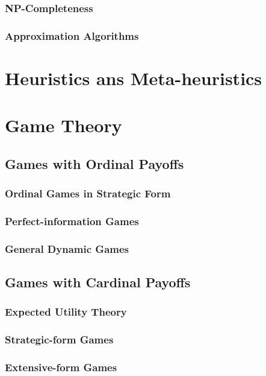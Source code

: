 \documentclass[10pt]{book}
\begin{document}
			\section{NP-Completeness}

			\section{Approximation Algorithms}

	\part{Heuristics ans Meta-heuristics}

	\part{Game Theory}
		\chapter{Games with Ordinal Payoffs}
			\section{Ordinal Games in Strategic Form}

			\section{Perfect-information Games}

			\section{General Dynamic Games}

		\chapter{Games with Cardinal Payoffs}
			\section{Expected Utility Theory}

			\section{Strategic-form Games}

			\section{Extensive-form Games}
\end{document}
